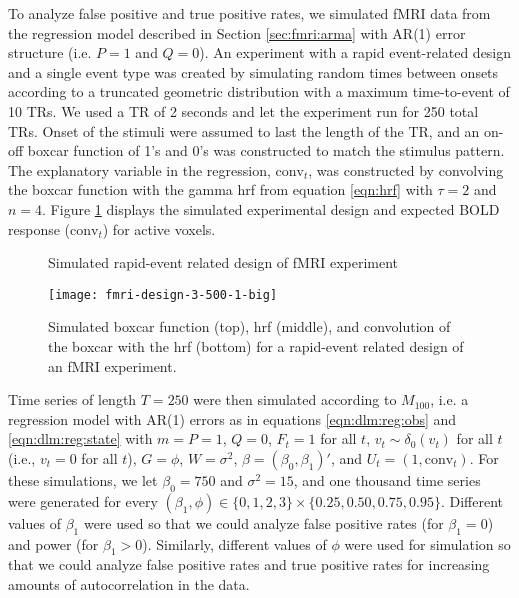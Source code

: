 To analyze false positive and true positive rates, we simulated fMRI data from the regression model described in Section \ref{sec:fmri:arma} with AR(1) error structure (i.e. $P = 1$ and $Q = 0$). An experiment with a rapid event-related design and a single event type was created by simulating random times between onsets according to a truncated geometric distribution with a maximum time-to-event of 10 TRs. We used a TR of 2 seconds and let the experiment run for 250 total TRs. Onset of the stimuli were assumed to last the length of the TR, and an on-off boxcar function of 1's and 0's was constructed to match the stimulus pattern. The explanatory variable in the regression, $\mbox{conv}_t$, was constructed by convolving the boxcar function with the gamma hrf from equation \eqref{eqn:hrf} with $\tau = 2$ and $n = 4$. Figure \ref{fig:fmri:design} displays the simulated experimental design and expected BOLD response ($\mbox{conv}_t$) for active voxels.

\begin{figure}
\ssp
\centering
\caption{Simulated rapid-event related design of fMRI experiment} \label{fig:fmri:design}
\texttt{[image: fmri-design-3-500-1-big]}
\caption*{Simulated boxcar function (top), hrf (middle), and convolution of the boxcar with the hrf (bottom) for a rapid-event related design of an fMRI experiment.}
\end{figure}

Time series of length $T = 250$ were then simulated according to $M_{100}$, i.e. a regression model with AR(1) errors as in equations \eqref{eqn:dlm:reg:obs} and \eqref{eqn:dlm:reg:state} with $m = P = 1$, $Q = 0$, $F_t = 1$ for all $t$, $v_t \sim \delta_0(v_t)$ for all $t$ (i.e., $v_t = 0$ for all $t$), $G = \phi$, $W = \sigma^2$, $\beta = (\beta_0,\beta_1)'$, and $U_t = (1, \mbox{conv}_t)$. For these simulations, we let $\beta_0 = 750$ and $\sigma^2 = 15$, and one thousand time series were generated for every $(\beta_1,\phi) \in \{0,1,2,3\}\times\{0.25,0.50,0.75,0.95\}$. Different values of $\beta_1$ were used so that we could analyze false positive rates (for $\beta_1 = 0$) and power (for $\beta_1 > 0$). Similarly, different values of $\phi$ were used for simulation so that we could analyze false positive rates and true positive rates for increasing amounts of autocorrelation in the data.

